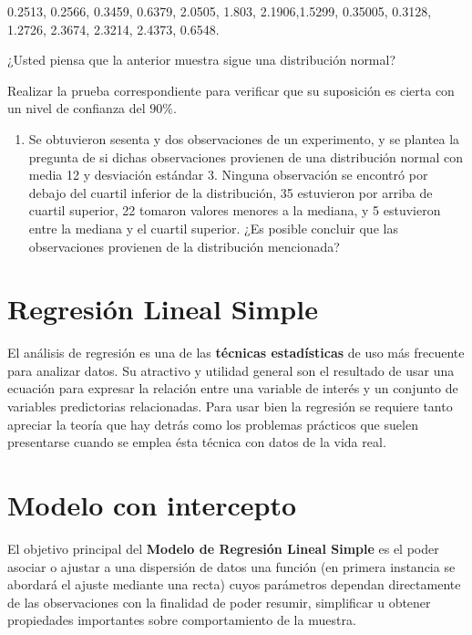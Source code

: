 \documentclass[
  a4paper,
  oneside,
  openany]{book}
\providecommand{\tightlist}{%
  \setlength{\itemsep}{0pt}\setlength{\parskip}{0pt}}
\begin{document}
0.2513, 0.2566, 0.3459, 0.6379, 2.0505, 1.803, 2.1906,1.5299,
0.35005, 0.3128, 1.2726, 2.3674, 2.3214, 2.4373, 0.6548.

¿Usted piensa que la anterior muestra sigue una distribución normal?

Realizar la prueba correspondiente para verificar que su suposición es cierta con un nivel de confianza del \(90\%\).

\begin{enumerate}
\def\labelenumi{\arabic{enumi}.}
\setcounter{enumi}{2}
\tightlist
\item
  Se obtuvieron sesenta y dos observaciones de un experimento, y se plantea la pregunta de si dichas observaciones provienen de una distribución normal con media 12 y desviación estándar 3. Ninguna observación se encontró por debajo del cuartil inferior de la distribución, 35 estuvieron por arriba de cuartil superior, 22 tomaron valores menores a la mediana, y 5 estuvieron entre la mediana y el cuartil superior. ¿Es posible concluir que las observaciones provienen de la distribución mencionada?
\end{enumerate}

\hypertarget{regresiuxf3n-lineal-simple}{%
\chapter*{Regresión Lineal Simple}\label{regresiuxf3n-lineal-simple}}


El análisis de regresión es una de las \textbf{técnicas estadísticas} de uso más frecuente para analizar datos. Su atractivo y utilidad general son el resultado de usar una ecuación para expresar la relación entre una variable de interés y un conjunto de variables predictorias relacionadas. Para usar bien la regresión se requiere tanto apreciar la teoría que hay detrás como los problemas prácticos que suelen presentarse cuando se emplea ésta técnica con datos de la vida real.

\hypertarget{modelo-con-intercepto}{%
\chapter{Modelo con intercepto}\label{modelo-con-intercepto}}

El objetivo principal del \textbf{Modelo de Regresión Lineal Simple} es el poder asociar o ajustar a una dispersión de datos una función (en primera instancia se abordará el ajuste mediante una recta) cuyos parámetros dependan directamente de las observaciones con la finalidad de poder resumir, simplificar u obtener propiedades importantes sobre comportamiento de la muestra.
\end{document}
